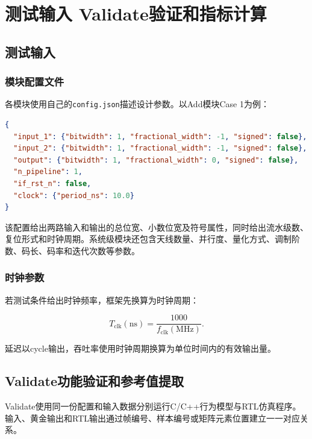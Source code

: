 \documentclass[a4paper,oneside,11pt]{ctexrep}
\begin{document}
\chapter{测试输入 Validate验证和指标计算}

\section{测试输入}

\subsection{模块配置文件}

各模块使用自己的\texttt{config.json}描述设计参数。以Add模块Case 1为例：

\begin{lstlisting}[language=json]
{
  "input_1": {"bitwidth": 1, "fractional_width": -1, "signed": false},
  "input_2": {"bitwidth": 1, "fractional_width": -1, "signed": false},
  "output": {"bitwidth": 1, "fractional_width": 0, "signed": false},
  "n_pipeline": 1,
  "if_rst_n": false,
  "clock": {"period_ns": 10.0}
}
\end{lstlisting}

该配置给出两路输入和输出的总位宽、小数位宽及符号属性，同时给出流水级数、复位形式和时钟周期。系统级模块还包含天线数量、并行度、量化方式、调制阶数、码长、码率和迭代次数等参数。

\subsection{时钟参数}

若测试条件给出时钟频率，框架先换算为时钟周期：

\begin{equation}
    T_{\mathrm{clk}}(\mathrm{ns})
    =\frac{1000}{f_{\mathrm{clk}}(\mathrm{MHz})}.
\end{equation}

延迟以cycle输出，吞吐率使用时钟周期换算为单位时间内的有效输出量。

\section{Validate功能验证和参考值提取}

Validate使用同一份配置和输入数据分别运行C/C++行为模型与RTL仿真程序。输入、黄金输出和RTL输出通过帧编号、样本编号或矩阵元素位置建立一一对应关系。
\end{document}
